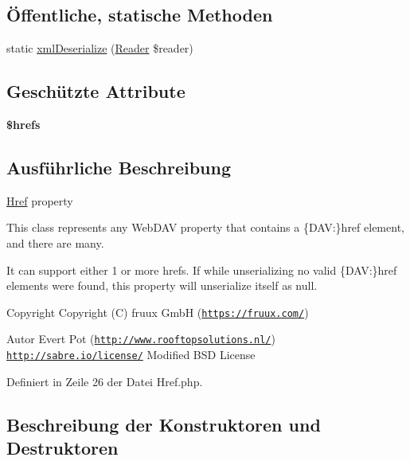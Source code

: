\subsection*{Öffentliche, statische Methoden}
\begin{DoxyCompactItemize}
\item 
static \mbox{\hyperlink{class_sabre_1_1_d_a_v_1_1_xml_1_1_property_1_1_href_a021325c5d0dc84191a83e9937d2078e5}{xml\+Deserialize}} (\mbox{\hyperlink{class_sabre_1_1_xml_1_1_reader}{Reader}} \$reader)
\end{DoxyCompactItemize}
\subsection*{Geschützte Attribute}
\begin{DoxyCompactItemize}
\item 
\mbox{\label{class_sabre_1_1_d_a_v_1_1_xml_1_1_property_1_1_href_af9453d29caf54c4d9a18210835368134}} 
{\bfseries \$hrefs}
\end{DoxyCompactItemize}


\subsection{Ausführliche Beschreibung}
\mbox{\hyperlink{class_sabre_1_1_d_a_v_1_1_xml_1_1_property_1_1_href}{Href}} property

This class represents any Web\+D\+AV property that contains a \{D\+AV\+:\}href element, and there are many.

It can support either 1 or more hrefs. If while unserializing no valid \{D\+AV\+:\}href elements were found, this property will unserialize itself as null.

\begin{DoxyCopyright}{Copyright}
Copyright (C) fruux GmbH (\href{https://fruux.com/}{\tt https\+://fruux.\+com/}) 
\end{DoxyCopyright}
\begin{DoxyAuthor}{Autor}
Evert Pot (\href{http://www.rooftopsolutions.nl/}{\tt http\+://www.\+rooftopsolutions.\+nl/})  \href{http://sabre.io/license/}{\tt http\+://sabre.\+io/license/} Modified B\+SD License 
\end{DoxyAuthor}


Definiert in Zeile 26 der Datei Href.\+php.



\subsection{Beschreibung der Konstruktoren und Destruktoren}
\mbox{\label{class_sabre_1_1_d_a_v_1_1_xml_1_1_property_1_1_href_a4bbe64d77061335cca13427418d6ae91}} 
